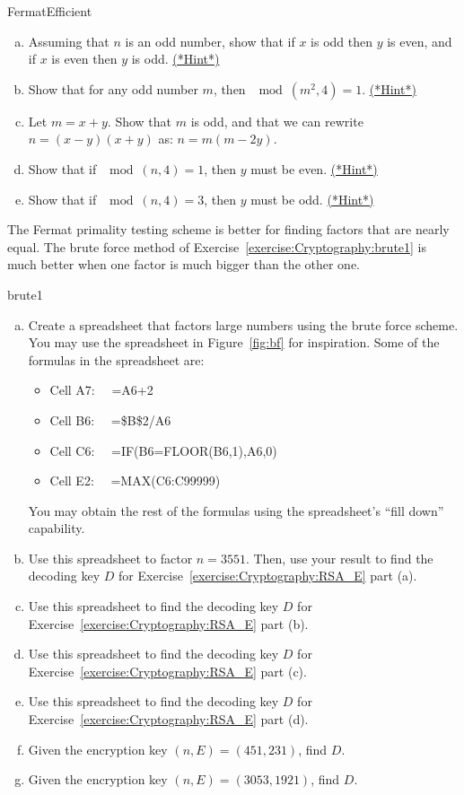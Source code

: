 \begin{exercise}{FermatEfficient}
\begin{enumerate}[(a)]
\item
Assuming that $n$ is an odd number, show that if $x$ is odd then $y$ is even, and if $x$ is even then $y$ is odd.
\hyperref[sec:Cryptography:Hints]{(*Hint*)}
\item
Show that for any odd number $m$, then $\mod(m^2,4) = 1$.
\hyperref[sec:Cryptography:Hints]{(*Hint*)}
\item
Let $m = x + y$. Show that $m$ is odd, and that we can rewrite  $n  = (x-y)(x+y)$ as: $n = m(m-2y)$. 
\item
Show that if $\mod(n,4)=1$, then $y$ must be even.
\hyperref[sec:Cryptography:Hints]{(*Hint*)}
\item
Show that if $\mod(n,4)=3$, then $y$ must be odd.
\hyperref[sec:Cryptography:Hints]{(*Hint*)}
\end{enumerate}
\end{exercise}

The Fermat primality testing scheme is better for finding factors that are nearly equal. The brute force method of Exercise~\ref{exercise:Cryptography:brute1}  is much better when one factor is much bigger than the other one.

\begin{exercise}{brute1}
\begin{enumerate}[(a)]
\item
Create a spreadsheet that factors large numbers using the brute force scheme. You may use the spreadsheet in Figure~\ref{fig:bf} for inspiration. Some of the formulas in the spreadsheet are:
\begin{itemize}
\item
Cell A7: ~~=A6+2
\item
Cell B6:  ~~=\$B\$2/A6
\item
Cell C6:  ~~=IF(B6=FLOOR(B6,1),A6,0)
\item
Cell E2: ~~=MAX(C6:C99999)
\end{itemize}
You may obtain the rest of the formulas using the spreadsheet's ``fill down'' capability.
\item
Use this spreadsheet to factor $n=3551$. Then, use your result to find the decoding key $D$ for Exercise~\ref{exercise:Cryptography:RSA_E} part (a).
\item
Use this spreadsheet to  find the decoding key $D$ for Exercise~\ref{exercise:Cryptography:RSA_E} part (b).
\item
Use this spreadsheet to  find the decoding key $D$ for Exercise~\ref{exercise:Cryptography:RSA_E} part (c).
\item
Use this spreadsheet to  find the decoding key $D$ for Exercise~\ref{exercise:Cryptography:RSA_E} part (d).
\item
Given the encryption key $(n,E) = (451,231)$, find $D$.
\item
Given the encryption key $(n,E) = (3053,1921)$, find $D$.
\end{enumerate}
\end{exercise}

